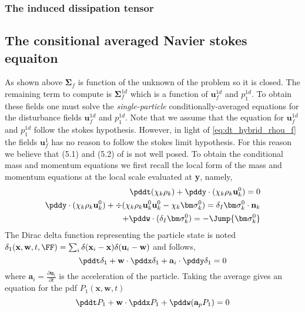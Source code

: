\subsubsection*{The induced dissipation tensor}


\subsection*{The consitional averaged Navier stokes equaiton}
As shown above $\bm\Sigma_f$ is function of the unknown of the problem so it is closed. 
The remaining term to compute is $\bm\Sigma_f^{1d}$ which is a function of $\textbf{u}_f^{1d}$ and $p_1^{1d}$. 
To obtain these fields one must solve the \textit{single-particle} conditionally-averaged equations for the disturbance fields  $\textbf{u}_f^{1d}$ and $p_1^{1d}$. 
Note that we assume that the equation for  $\textbf{u}_f^{1d}$ and $p_1^{1d}$ follow the stokes hypothesis. 
However, in light of \ref{eq:dt_hybrid_rhou_f} the fields $\textbf{u}_f^{1}$ has no reason to follow the stokes limit hypothesis. 
For this reason we believe that (5.1) and (5.2) of \citet{zhang1997momentum} is not well posed. 
To obtain the conditional mass and momentum equations we first recall the local form of the mass and momentum equations at the local scale evaluated at \textbf{y}, namely, 
\begin{align*}
    \pddt (\chi_k \rho_k ) 
    +  \pddy \cdot (\chi_k \rho_k  \textbf{u}_k^0) = 0 \\
    \pddy\cdot (\chi_k \rho_k \textbf{u}_k^0 ) 
    +  \div (\chi_k \rho_k  \textbf{u}_k^0\textbf{u}_k^0 - \chi_k \bm\sigma_k^0 ) = \delta_I \bm\sigma_k^0 \cdot \textbf{n}_k\\
    +  \pddw \cdot (\delta_I \bm\sigma_k^0 ) = - \Jump{\bm\sigma_k^0}
\end{align*}
The Dirac delta function representing the particle state is noted $\delta_1(\textbf{x},\textbf{w},t,\FF) = \sum_i \delta(\textbf{x}_i - \textbf{x})\delta(\textbf{u}_i - \textbf{w})$ and follows, 
\begin{equation*}
    \pddt \delta_1 
    + \textbf{w}\cdot \pddx \delta_1 
    + \textbf{a}_i \cdot \pddy \delta_1 
    = 0 
\end{equation*}
where $\textbf{a}_i = \frac{\partial \textbf{u}_i}{\partial t}$ is the acceleration of the particle. 
Taking the average gives an equation for the pdf $P_1(\textbf{x},\textbf{w},t)$
\begin{equation*}
    \pddt P_1 
    + \textbf{w}\cdot \pddx P_1 
    +  \pddw(\textbf{a}_p P_1 )
    = 0 
\end{equation*}


